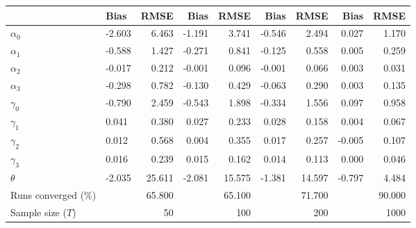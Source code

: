 
\begin{tabular}[t]{llrrrrrrr}
\toprule
  & Bias & RMSE & Bias & RMSE & Bias & RMSE & Bias & RMSE\\
\midrule
$\alpha_{0}$ & -2.603 & 6.463 & -1.191 & 3.741 & -0.546 & 2.494 & 0.027 & 1.170\\
$\alpha_{1}$ & -0.588 & 1.427 & -0.271 & 0.841 & -0.125 & 0.558 & 0.005 & 0.259\\
$\alpha_{2}$ & -0.017 & 0.212 & -0.001 & 0.096 & -0.001 & 0.066 & 0.003 & 0.031\\
$\alpha_{3}$ & -0.298 & 0.782 & -0.130 & 0.429 & -0.063 & 0.290 & 0.003 & 0.135\\
$\gamma_{0}$ & -0.790 & 2.459 & -0.543 & 1.898 & -0.334 & 1.556 & 0.097 & 0.958\\
$\gamma_{1}$ & 0.041 & 0.380 & 0.027 & 0.233 & 0.028 & 0.158 & 0.004 & 0.067\\
$\gamma_{2}$ & 0.012 & 0.568 & 0.004 & 0.355 & 0.017 & 0.257 & -0.005 & 0.107\\
$\gamma_{3}$ & 0.016 & 0.239 & 0.015 & 0.162 & 0.014 & 0.113 & 0.000 & 0.046\\
$\theta$ & -2.035 & 25.611 & -2.081 & 15.575 & -1.381 & 14.597 & -0.797 & 4.484\\
Runs converged (\%) &  & 65.800 &  & 65.100 &  & 71.700 &  & 90.000\\
Sample size ($T$) &  & 50 &  & 100 &  & 200 &  & 1000\\
\bottomrule
\end{tabular}
